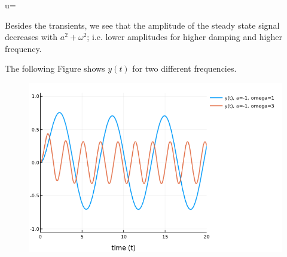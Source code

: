 \bee
u=
\eee

Besides the transients, we see that the amplitude of the steady state signal decreases with $a^2 + \omega^2$; i.e. lower amplitudes for higher damping and higher frequency.


The following Figure shows $y(t)$ for two different frequencies.

\begin{figure}[H]
	\includegraphics[scale=0.5]{images/ode_02_05.png}
\end{figure}
